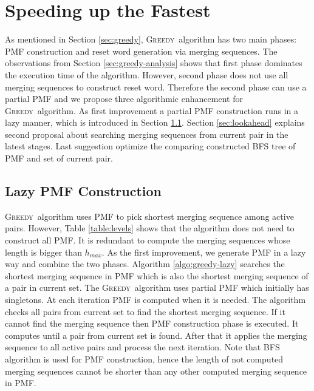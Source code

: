 \documentclass[12pt]{article}
\newcommand{\greedyAlgo}{\textsc{Greedy}}
\begin{document}
\clearpage
\section{Speeding up the Fastest}
\label{sec:speedup}

As mentioned in Section \ref{sec:greedy}, \greedyAlgo\ algorithm has two main phases: PMF construction and reset word generation via merging sequences. The observations from Section \ref{sec:greedy-analysis} shows that first phase dominates the execution time of the algorithm. However, second phase does not use all merging sequences to construct reset word. Therefore the second phase can use a partial PMF and we propose three algorithmic enhancement for \greedyAlgo\ algorithm. As first improvement a partial PMF construction runs in a lazy manner, which is introduced in Section \ref{sec:lazy}. Section \ref{sec:lookahead} explains second proposal about searching merging sequences from current pair in the latest stages. Last suggestion optimize the comparing constructed BFS tree of PMF and set of current pair.  

\subsection{Lazy PMF Construction}
\label{sec:lazy}

\greedyAlgo\ algorithm uses PMF to pick shortest merging sequence among active pairs. However, Table \ref{table:levels} shows that the algorithm does not need to construct all PMF. It is redundant to compute the merging sequences whose length is bigger than $h_{max}$. As the first improvement, we generate PMF in a lazy way and combine the two phases. Algorithm \ref{algo:greedy-lazy} searches the shortest merging sequence in PMF which is also the shortest merging sequence of a pair in current set. The \greedyAlgo\ algorithm uses partial PMF which initially has singletons. At each iteration PMF is computed when it is needed. The algorithm checks all pairs from current set to find the shortest merging sequence. If it cannot find the merging sequence then PMF construction phase is executed. It computes until a pair from current set is found. After that it applies the merging sequence to all active pairs and process the next iteration. Note that BFS algorithm is used for PMF construction, hence the length of not computed merging sequences cannot be shorter than any other computed merging sequence in PMF.
 
\end{document}
